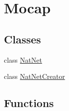 \hypertarget{group__mocap}{\section{Mocap}
\label{group__mocap}
}
\subsection*{Classes}
\begin{DoxyCompactItemize}
\item 
class \hyperlink{class_nat_net}{Nat\-Net}
\item 
class \hyperlink{class_nat_net_creator}{Nat\-Net\-Creator}
\end{DoxyCompactItemize}
\subsection*{Functions}
